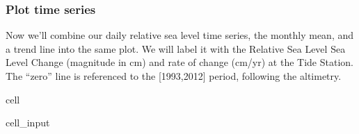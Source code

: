 \documentclass[letterpaper,10pt,english]{jupyterBook}
\begin{document}
\subsubsection{Plot time series}
\label{\detokenize{notebooks/regional_and_local/SL_Trend:rsltimeseries}}\label{\detokenize{notebooks/regional_and_local/SL_Trend:id2}}
\sphinxAtStartPar
Now we’ll combine our daily relative sea level time series, the monthly mean, and a trend line into the same plot. We will label it with the Relative Sea Level Sea Level Change (magnitude in cm) and rate of change (cm/yr) at the Tide Station. The “zero” line is referenced to the {[}1993,2012{]} period, following the altimetry.

\begin{sphinxuseclass}{cell}\begin{sphinxVerbatimInput}

\begin{sphinxuseclass}{cell_input}
\begin{sphinxVerbatim}[commandchars=\\\{\}]
  


  

   


\end{sphinxVerbatim}
\end{sphinxuseclass}
\end{sphinxVerbatimInput}
\end{sphinxuseclass}
\end{document}

